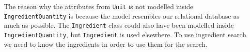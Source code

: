 The reason why the attributes from \lstinline|Unit| is not modelled inside \lstinline|IngredientQuantity| is because the model resembles our relational database as much as possible. The \lstinline|Ingredient| class could also have been modelled inside \lstinline|IngredientQuantity|, but \lstinline|Ingredient| is used elsewhere. To use ingredient search we need to know the ingredients in order to use them for the search.